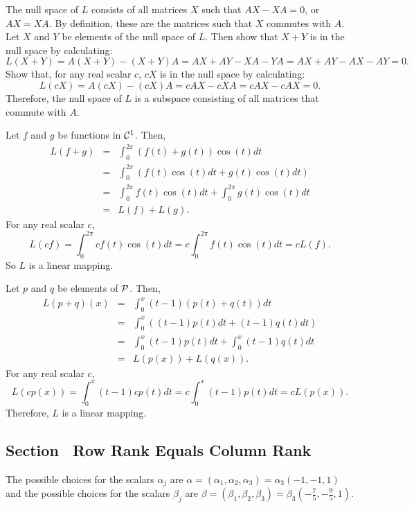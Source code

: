 \documentclass{ximera}
\begin{document}
\para The null space of $L$ consists of all matrices $X$ such that
$AX - XA = 0$, or $AX = XA$.  By definition, these are the matrices
such that $X$ commutes with $A$.  Let $X$ and $Y$ be elements of
the null space of $L$.  Then show that $X + Y$ is in the null space
by calculating:
\[ L(X + Y) = A(X + Y) - (X + Y)A = AX + AY - XA - YA = AX + AY - AX
- AY = 0. \]
Show that, for any real scalar $c$, $cX$ is in the null space by
calculating:
\[ L(cX) = A(cX) - (cX)A = cAX - cXA = cAX - cAX = 0. \]
Therefore, the null space of $L$ is a subspace consisting of all
matrices that commute with $A$.

Let $f$ and $g$ be functions in ${\cal C}^1$.  Then,
\[ \begin{array}{rcl}
 L(f + g) & = & \int_0^{2\pi}(f(t) + g(t))\cos(t)dt \\
& = & \int_0^{2\pi}(f(t)\cos(t)dt + g(t)\cos(t)dt) \\
& = & \int_0^{2\pi}f(t)\cos(t)dt + \int_0^{2\pi}g(t)\cos(t)dt \\
& = & L(f) + L(g). \end{array} \]
For any real scalar $c$,
\[ L(cf) = \int_0^{2\pi}cf(t)\cos(t)dt = c\int_0^{2\pi}f(t)\cos(t)dt
= cL(f). \]
So $L$ is a linear mapping.

Let $p$ and $q$ be elements of ${\cal P}$.  Then,
\[ \begin{array}{rcl}
L(p + q)(x) & = & \int_0^x(t - 1)(p(t) + q(t))dt \\
& = & \int_0^x((t - 1)p(t)dt + (t - 1)q(t)dt) \\
& = & \int_0^x(t - 1)p(t)dt + \int_0^x(t - 1)q(t)dt \\
& = & L(p(x)) + L(q(x)). \end{array} \]
For any real scalar $c$,
\[ L(cp(x)) = \int_0^x(t - 1)cp(t)dt = c\int_0^x(t - 1)p(t)dt
= cL(p(x)). \]
Therefore, $L$ is a linear mapping.



\newpage
\subsection*{Section~\protect{\ref{S:5.8}} Row Rank Equals Column Rank}

\ans The possible choices for the scalars $\alpha_j$ are
$\alpha = (\alpha_1,\alpha_2,\alpha_3) = \alpha_3(-1,-1,1)$ and
the possible choices for the scalars $\beta_j$ are $\beta = 
(\beta_1,\beta_2,\beta_3) = \beta_3(-\frac{7}{5},-\frac{9}{5},1)$.
\end{document}
